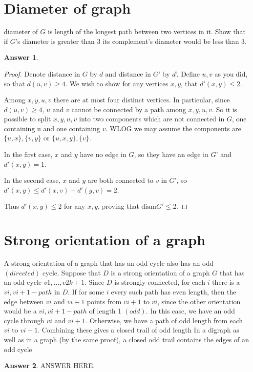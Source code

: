 \documentclass[a4paper]{article}
\renewcommand{\(}{\left(}
\renewcommand{\)}{\right)}
\theoremstyle{plain}
\theoremstyle{plain}
\theoremstyle{definition}
\newtheorem*{answer}{Answer}
\begin{document}
\section{Diameter of graph}
diameter of $G$ is length of the longest path between two vertices in it.
Show that if $G$'s diameter is greater than 3 its complement's diameter would be less than 3.
\begin{shaded}
\begin{answer}
\begin{proof}
Denote distance in $G$ by $d$ and distance in $G$' by $d$'. Define $u,v$ as you did, so that $d(u,v) \geq 4$. We wish to show for any vertices $x,y$, that $d'(x,y) \leq 2$.

Among $x,y,u,v$ there are at most four distinct vertices. In particular, since $d(u,v) \geq 4$, $u$ and $v$ cannot be connected by a path among $x,y,u,v$. So it is possible to split $x,y,u,v$ into two components which are not connected in $G$, one containing u and one containing $v$. WLOG we may assume the components are $\{u,x\},\{v,y\}$ or $\{u,x,y\},\{v\}$.

In the first case, $x$ and $y$ have no edge in $G$, so they have an edge in $G$' and $d'(x,y)=1$.

In the second case, $x$ and $y$ are both connected to $v$ in $G$', so $d'(x,y) \leq d'(x,v) + d'(y,v)=2$.

Thus $d'(x,y) \leq 2$ for any $x,y$, proving that $\text{diam}G' \leq 2$.
\end{proof}
\end{answer}
\end{shaded}


\section{Strong orientation of a graph}
A strong orientation of a graph that has an odd cycle also has an odd $(directed)$ cycle. Suppose that $D$ is a strong orientation of a graph $G$ that has an odd cycle $v1, \dots , v2k+1$. Since $D$ is strongly connected, for each $i$ there is a $vi, vi+1-path$ in $D$. If for some $i$ every such path has even length, then the edge between $vi$ and $vi+1$ points from $vi+1$ to $vi$, since the other orientation would be a $vi, vi+1-path$ of length 1 $(odd)$. In this case, we have an odd cycle through $vi$ and $vi+1$. Otherwise, we have a path of odd length from each $vi$ to $vi+1$. Combining these gives a closed trail of odd length In a digraph as well as in a graph (by the same proof), a closed odd trail contains the edges of an odd cycle
\begin{shaded}
\begin{answer}
ANSWER HERE.
\end{answer}
\end{shaded}
\end{document}
